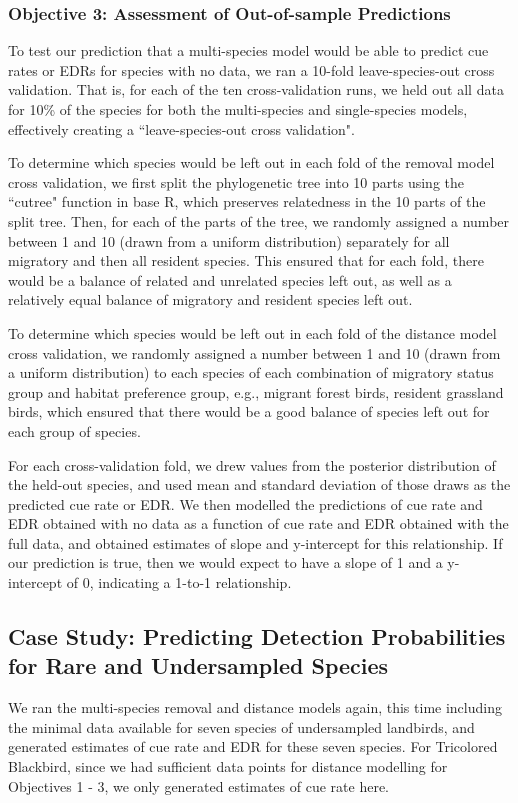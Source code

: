 \documentclass[12pt]{article}
\begin{document}
\subsubsection{Objective 3: Assessment of Out-of-sample Predictions}
\par To test our prediction that a multi-species model would be able to predict cue rates or EDRs for species with no data, we ran a 10-fold leave-species-out cross validation.
That is, for each of the ten cross-validation runs, we held out all data for 10\% of the species for both the multi-species and single-species models, effectively creating a ``leave-species-out cross validation".

\par To determine which species would be left out in each fold of the removal model cross validation, we first split the phylogenetic tree into 10 parts using the ``cutree" function in base R, which preserves relatedness in the 10 parts of the split tree.
Then, for each of the parts of the tree, we randomly assigned a number between 1 and 10 (drawn from a uniform distribution) separately for all migratory and then all resident species.
This ensured that for each fold, there would be a balance of related and unrelated species left out, as well as a relatively equal balance of migratory and resident species left out.

\par To determine which species would be left out in each fold of the distance model cross validation, we randomly assigned a number between 1 and 10 (drawn from a uniform distribution) to each species of each combination of migratory status group and habitat preference group, e.g., migrant forest birds, resident grassland birds, which ensured that there would be a good balance of species left out for each group of species.

For each cross-validation fold, we drew values from the posterior distribution of the held-out species, and used mean and standard deviation of those draws as the predicted cue rate or EDR.
We then modelled the predictions of cue rate and EDR obtained with no data as a function of cue rate and EDR obtained with the full data, and obtained estimates of slope and y-intercept for this relationship.
If our prediction is true, then we would expect to have a slope of 1 and a y-intercept of 0, indicating a 1-to-1 relationship.

\subsection{Case Study: Predicting Detection Probabilities for Rare and Undersampled Species}
\par We ran the multi-species removal and distance models again, this time including the minimal data available for seven species of undersampled landbirds, and generated estimates of cue rate and EDR for these seven species.
For Tricolored Blackbird, since we had sufficient data points for distance modelling for Objectives 1 - 3, we only generated estimates of cue rate here.
\end{document}
